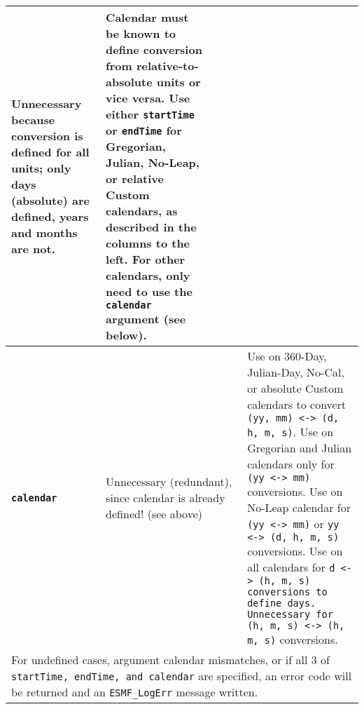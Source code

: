 \begin{center}
\begin{table}
\begin{tabular}{|p{1.5in}|p{1.25in}|p{1.25in}|p{1.25in}|p{1.25in}|p{1.25in}|}
  Unnecessary because conversion is defined for all units; only days (absolute) are defined, years and months are not. &

  Calendar must be known to define conversion from relative-to-absolute units or vice versa.  Use either {\tt startTime} or {\tt endTime} for Gregorian, Julian, No-Leap, or relative Custom calendars, as described in the columns to the left.  For other calendars, only need to use the {\tt calendar} argument (see below). \\
\hline

{\bf {\tt calendar}} &
  \multicolumn{4}{l}{Unnecessary (redundant), since calendar is already defined! (see above)} &

  Use on 360-Day, Julian-Day, No-Cal, or absolute Custom calendars to convert {\tt (yy, mm) <-> (d, h, m, s)}.  Use on Gregorian and Julian calendars only for {\tt (yy <-> mm)} conversions.  Use on No-Leap calendar for {\tt (yy <-> mm)} or {\tt yy <-> (d, h, m, s)} conversions.  Use on all calendars for {\tt d <-> {\tt (h, m, s)} conversions to define days.  Unnecessary for {\tt (h, m, s)} <-> (h, m, s)} conversions.  \\
\hline

  \multicolumn{6}{l}{For undefined cases, argument calendar mismatches, or if all 3 of {\tt startTime, endTime, and calendar} are specified, an error code will be returned and an {\tt ESMF\_LogErr} message written.} \\
\hline

\end{tabular}
\end{table}
\end{center}
